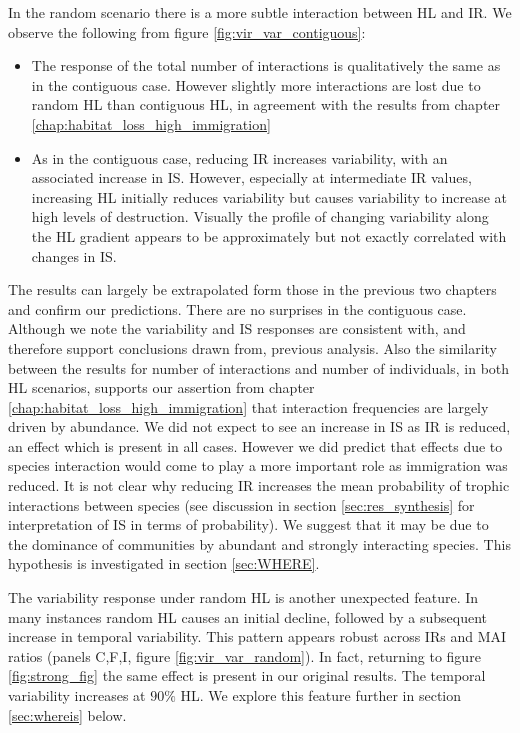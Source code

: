 In the random scenario there is a more subtle interaction between HL and IR. We observe the following from figure \ref{fig:vir_var_contiguous}:
\begin{itemize}
	\item The response of the total number of interactions is qualitatively the same as in the contiguous case. However slightly more interactions are lost due to random HL than contiguous HL, in agreement with the results from chapter \ref{chap:habitat_loss_high_immigration}
	\item As in the contiguous case, reducing IR increases variability, with an associated increase in IS. However, especially at intermediate IR values, increasing HL initially reduces variability but causes variability to increase at high levels of destruction. Visually the profile of changing variability along the HL gradient appears to be approximately but not exactly correlated with changes in IS.   
\end{itemize}

The results can largely be extrapolated form those in the previous two chapters and confirm our predictions. There are no surprises in the contiguous case. Although we note the variability and IS responses are consistent with, and therefore support conclusions drawn from, previous analysis. Also the similarity between the results for number of interactions and number of individuals, in both HL scenarios, supports our assertion from chapter \ref{chap:habitat_loss_high_immigration} that interaction frequencies are largely driven by abundance. We did not expect to see an increase in IS as IR is reduced, an effect which is present in all cases. However we did predict that effects due to species interaction would come to play a more important role as immigration was reduced. It is not clear why reducing IR increases the mean probability of trophic interactions between species (see discussion in section \ref{sec:res_synthesis} for interpretation of IS in terms of probability). We suggest that it may be due to the dominance of communities by abundant and strongly interacting species. This hypothesis is investigated in section \ref{sec:WHERE}. 

The variability response under random HL is another unexpected feature. In many instances random HL causes an initial decline, followed by a subsequent increase in temporal variability. This pattern appears robust across IRs and MAI ratios (panels C,F,I, figure \ref{fig:vir_var_random}). In fact, returning to figure \ref{fig:strong_fig} the same effect is present in our original results. The temporal variability increases at $90\%$ HL. We explore this feature further in section \ref{sec:whereis} below.

